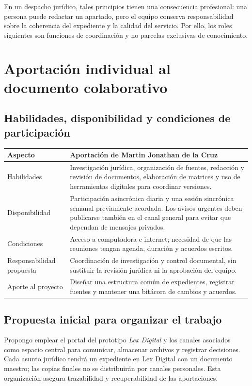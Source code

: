 \documentclass[
  spanish,
  letterpaper, oneside
]{article}
\begin{document}
En un despacho jurídico, tales principios tienen una consecuencia profesional: una
persona puede redactar un apartado, pero el equipo conserva responsabilidad sobre la
coherencia del expediente y la calidad del servicio. Por ello, los roles siguientes
son funciones de coordinación y no parcelas exclusivas de conocimiento.

\section{Aportación individual al documento colaborativo}

\subsection{Habilidades, disponibilidad y condiciones de participación}

\begin{longtable}{p{3.2cm}p{10.4cm}}
\toprule
\textbf{Aspecto} & \textbf{Aportación de Martin Jonathan de la Cruz} \\
\midrule
Habilidades & Investigación jurídica, organización de fuentes, redacción y revisión de documentos, elaboración de matrices y uso de herramientas digitales para coordinar versiones. \\
Disponibilidad & Participación asincrónica diaria y una sesión sincrónica semanal previamente acordada. Los avisos urgentes deben publicarse también en el canal general para evitar que dependan de mensajes privados. \\
Condiciones & Acceso a computadora e internet; necesidad de que las reuniones tengan agenda, duración y acuerdos escritos. \\
Responsabilidad propuesta & Coordinación de investigación y control documental, sin sustituir la revisión jurídica ni la aprobación del equipo. \\
Aporte al proyecto & Diseñar una estructura común de expedientes, registrar fuentes y mantener una bitácora de cambios y acuerdos. \\
\bottomrule
\end{longtable}

\subsection{Propuesta inicial para organizar el trabajo}

Propongo emplear el portal del prototipo \textit{Lex Digital} y los canales asociados
como espacio central para comunicar, almacenar archivos y registrar decisiones.
Cada asunto jurídico tendrá un expediente en Lex Digital con un documento maestro;
las copias finales no se distribuirán por canales personales. Esta organización
asegura trazabilidad y recuperabilidad de las aportaciones.
\end{document}
